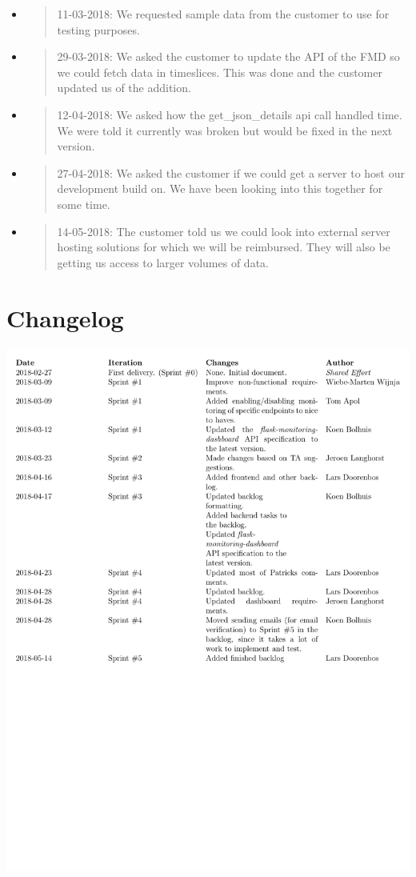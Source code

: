 \begin{itemize}
\item
  \begin{quote}
  11-03-2018: We requested sample data from the customer to use for
  testing purposes.
  \end{quote}
\item
  \begin{quote}
  29-03-2018: We asked the customer to update the API of the FMD so we
  could fetch data in timeslices. This was done and the customer updated
  us of the addition.
  \end{quote}
\item
  \begin{quote}
  12-04-2018: We asked how the get\_json\_details api call handled time.
  We were told it currently was broken but would be fixed in the next
  version.
  \end{quote}
\item
  \begin{quote}
  27-04-2018: We asked the customer if we could get a server to host our
  development build on. We have been looking into this together for some
  time.
  \end{quote}
\item
  \begin{quote}
  14-05-2018: The customer told us we could look into external server
  hosting solutions for which we will be reimbursed. They will also be
  getting us access to larger volumes of data.
  \end{quote}
\end{itemize}

\hypertarget{changelog}{%
\section{Changelog}\label{changelog}}

\includegraphics[width=2*\pagewidth]{changelog_requirements.pdf}
